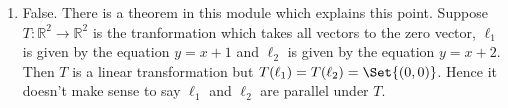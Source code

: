\begin{exercises}
\begin{problist}
\begin{solution}
\begin{enumerate}
				\item False. There is a theorem in this module which explains this point. Suppose $T:\mathbb R^2 \rightarrow \mathbb R^2$ is the tranformation which takes all vectors to the zero vector, $\ell_1$ is given by the equation $y=x+1$ and $\ell_2$ is given by the equation $y=x+2$.
Then $T$ is a linear transformation but $T(\ell_1)=T(\ell_2)=\Set{(0,0)}$.
Hence it doesn't make sense to say $\ell_1$ and $\ell_2$ are parallel under $T$.
			\end{enumerate}
		\end{solution}
	\end{problist}
\end{exercises}
